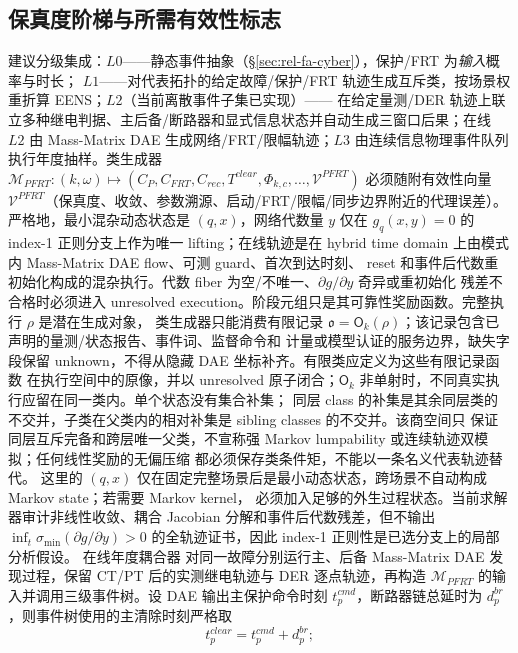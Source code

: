 \subsection{保真度阶梯与所需有效性标志}\label{sec:rel-pf-fidelity}
建议分级集成：$L0$——静态事件抽象（\S\ref{sec:rel-fa-cyber}），保护/FRT 为\emph{输入}概率与时长；
$L1$——对代表拓扑的给定故障/保护/FRT 轨迹生成互斥类，按场景权重折算 EENS；$L2$（当前离散事件子集已实现）——
在给定量测/DER 轨迹上联立多种继电判据、主后备/断路器和显式信息状态并自动生成三窗口后果；在线 $L2$ 由
Mass-Matrix DAE 生成网络/FRT/限幅轨迹；$L3$ 由连续信息物理事件队列执行年度抽样。类生成器
$\mathcal M_{PFRT}:(k,\omega)\mapsto(C_P,C_{FRT},C_{rec},T^{clear},\Phi_{k,c},\dots,\mathcal V^{PFRT})$
必须随附有效性向量 $\mathcal V^{PFRT}$（保真度、收敛、参数溯源、启动/FRT/限幅/同步边界附近的代理误差）。
严格地，最小混杂动态状态是 $(q,x)$，网络代数量 $y$ 仅在 $g_q(x,y)=0$ 的 index-1 正则分支上作为唯一
lifting；在线轨迹是在 hybrid time domain 上由模式内 Mass-Matrix DAE flow、可测 guard、首次到达时刻、
reset 和事件后代数重初始化构成的混杂执行。代数 fiber 为空/不唯一、$\partial g/\partial y$ 奇异或重初始化
残差不合格时必须进入 unresolved execution。阶段元组只是其可靠性奖励函数。完整执行 $\rho$ 是潜在生成对象，
类生成器只能消费有限记录 $\mathfrak o=\mathsf O_k(\rho)$；该记录包含已声明的量测/状态报告、事件词、监督命令和
计量或模型认证的服务边界，缺失字段保留 unknown，不得从隐藏 DAE 坐标补齐。有限类应定义为这些有限记录函数
在执行空间中的原像，并以 unresolved 原子闭合；$\mathsf O_k$ 非单射时，不同真实执行应留在同一类内。单个状态没有集合补集；
同层 class 的补集是其余同层类的不交并，子类在父类内的相对补集是 sibling classes 的不交并。该商空间只
保证同层互斥完备和跨层唯一父类，不宣称强 Markov lumpability 或连续轨迹双模拟；任何线性奖励的无偏压缩
都必须保存类条件矩，不能以一条名义代表轨迹替代。
这里的 $(q,x)$ 仅在固定完整场景后是最小动态状态，跨场景不自动构成 Markov state；若需要 Markov kernel，
必须加入足够的外生过程状态。当前求解器审计非线性收敛、耦合 Jacobian 分解和事件后代数残差，但不输出
$\inf_t\sigma_{\min}(\partial g/\partial y)>0$ 的全轨迹证书，因此 index-1 正则性是已选分支上的局部分析假设。
在线年度耦合器  对同一故障分别运行主、后备
Mass-Matrix DAE 发现过程，保留 CT/PT 后的实测继电轨迹与 DER 逐点轨迹，再构造
$\mathcal M_{PFRT}$ 的输入并调用三级事件树。设 DAE 输出主保护命令时刻 $t_p^{cmd}$，断路器链总延时为
$d_p^{br}$，则事件树使用的主清除时刻严格取
\begin{equation}
 t_p^{clear}=t_p^{cmd}+d_p^{br};
 \end{equation}
